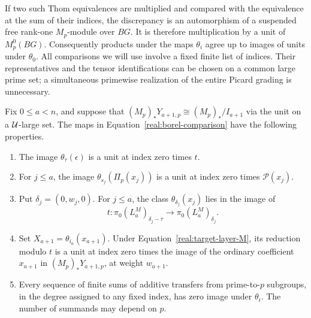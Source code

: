 If two such Thom equivalences are multiplied and compared with the
equivalence at the sum of their indices, the discrepancy is an
automorphism of a suspended free rank-one \(M_p\)-module over
\(BG\).  It is therefore multiplication by a unit of
\(M_p^0(BG)\).  Consequently products under the maps
\(\theta_i\) agree up to images of units under \(\theta_0\).
All comparisons we will use involve a fixed finite list of indices.
Their representatives and the tensor identifications can be chosen
on a common large prime set; a simultaneous primewise realization
of the entire Picard grading is unnecessary.

\begin{lemma}\label{real:thom-comparisons}
Fix \(0\leq a<n\), and suppose that
\((M_p)_*Y_{a+1,p}\cong(M_p)_*/I_{a+1}\) via the unit on a
\(\mathcal U\)-large set.  The maps in
Equation~\eqref{real:borel-comparison} have the following properties.
\begin{enumerate}
\item The image \(\theta_\tau(\epsilon)\) is a unit at index
zero times \(t\).
\item For \(j\leq a\), the image
\(\theta_{s_j}(\Pi_p(x_j))\) is a unit at index zero times
\(\mathcal P(x_j)\).
\item Put \(\delta_j=(0,w_j,0)\).  For \(j\leq a\), the
class \(\theta_{\delta_j}(x_j)\) lies in the image of
\[
 t:\pi_0(L_a^M)_{\delta_j-\tau}
 \longrightarrow\pi_0(L_a^M)_{\delta_j}.
\]
\item Set \(X_{a+1}=\theta_{i_a}(x_{a+1})\).  Under
Equation~\eqref{real:target-layer-M}, its reduction modulo \(t\)
is a unit at index zero times the image of the ordinary coefficient
\(x_{a+1}\) in \((M_p)_*Y_{a+1,p}\), at weight \(w_{a+1}\).
\item Every sequence of finite sums of additive transfers from
prime-to-\(p\) subgroups, in the degree assigned to any fixed
index, has zero image under \(\theta_i\).  The number of
summands may depend on \(p\).
\end{enumerate}
\end{lemma}

